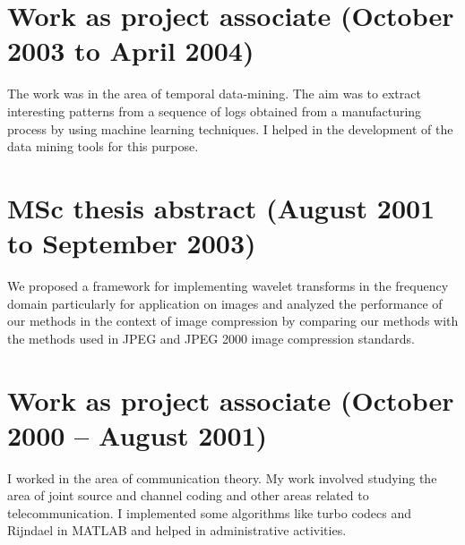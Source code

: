 \documentclass{article}
\begin{document}
\section{Work as project associate (October 2003 to April 2004)}\label{sec:dataMining}
The work was in the area of temporal data-mining. 
The aim was to extract interesting patterns from a sequence of logs
obtained from a manufacturing process by using machine learning techniques.
I helped in the development of the data mining tools for this purpose.
%

\section{MSc thesis abstract (August 2001 to September 2003)}\label{sec:mastersAbstract}
We proposed a
framework for implementing wavelet transforms in the frequency domain
particularly for application on images and analyzed the performance of our
methods in the context of image compression by comparing our methods with
the methods used in JPEG and JPEG 2000 image compression
standards. 


\section{Work as project associate (October 2000 -- August
2001)}\label{sec:turbo}
I worked in the area of communication theory. My work involved studying
the area of joint source and channel coding and other areas related to
telecommunication. I implemented some algorithms like turbo codecs and
Rijndael in MATLAB and helped in administrative activities.
\end{document}
